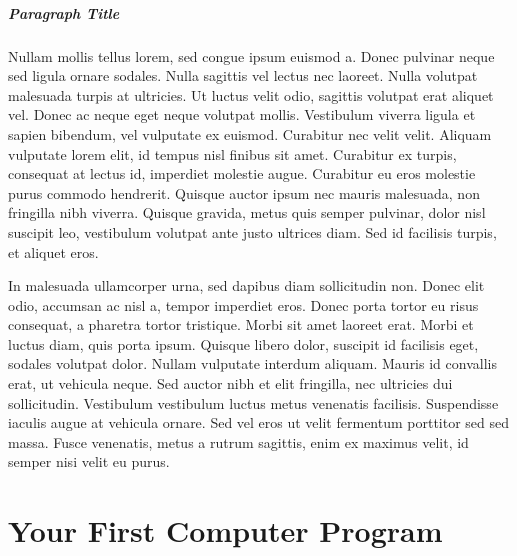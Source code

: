 \paragraph{Paragraph Title} Nullam mollis tellus
lorem, sed congue ipsum euismod a. Donec pulvinar neque sed ligula ornare
sodales. Nulla sagittis vel lectus nec laoreet. Nulla volutpat malesuada turpis
at ultricies. Ut luctus velit odio, sagittis volutpat erat aliquet vel. Donec
ac neque eget neque volutpat mollis. Vestibulum viverra ligula et sapien
bibendum, vel vulputate ex euismod. Curabitur nec velit velit. Aliquam
vulputate lorem elit, id tempus nisl finibus sit amet. Curabitur ex turpis,
consequat at lectus id, imperdiet molestie augue. Curabitur eu eros molestie
purus commodo hendrerit. Quisque auctor ipsum nec mauris malesuada, non
fringilla nibh viverra. Quisque gravida, metus quis semper pulvinar, dolor nisl
suscipit leo, vestibulum volutpat ante justo ultrices diam. Sed id facilisis
turpis, et aliquet eros.

In malesuada ullamcorper urna, sed dapibus diam sollicitudin non. Donec elit
odio, accumsan ac nisl a, tempor imperdiet eros. Donec porta tortor eu risus
consequat, a pharetra tortor tristique. Morbi sit amet laoreet erat. Morbi et
luctus diam, quis porta ipsum. Quisque libero dolor, suscipit id facilisis
eget, sodales volutpat dolor. Nullam vulputate interdum aliquam. Mauris id
convallis erat, ut vehicula neque. Sed auctor nibh et elit fringilla, nec
ultricies dui sollicitudin. Vestibulum vestibulum luctus metus venenatis
facilisis. Suspendisse iaculis augue at vehicula ornare. Sed vel eros ut velit
fermentum porttitor sed sed massa. Fusce venenatis, metus a rutrum sagittis,
enim ex maximus velit, id semper nisi velit eu purus.


\chapter{Your First Computer Program}

